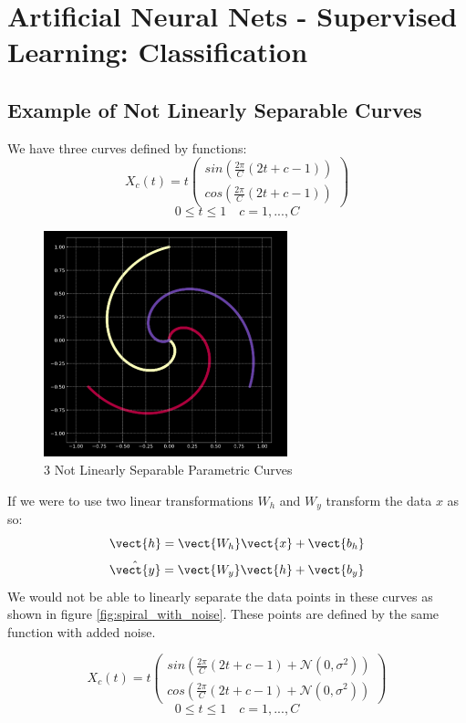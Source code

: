 \chapter{Artificial Neural Nets - Supervised Learning: Classification }

\section{Example of Not Linearly Separable Curves}

We have three curves defined by functions:
\[X_c(t) = t
\begin{pmatrix}
    sin( \frac{2 \pi}{C}(2t + c -1)) \\
    cos( \frac{2 \pi}{C}(2t + c -1))
\end{pmatrix}
 \]
\[ 0 \leq t \leq 1 \quad c = 1,..., C\]

\begin{figure}[ht]
    \centering
    \includegraphics[width=200pt]{labs/02/images/spiral1.png}
    \caption{3 Not Linearly Separable Parametric Curves}
    \label{fig:spiral}
\end{figure}
 
\newpage

If we were to use two linear transformations $ W_h$ and $ W_y$  transform the data $x$ as so:
\[\vect{h}= \vect{W_h}\vect{x}+ \vect{b_h} \]
\[\hat{\vect{y}} = \vect{W_y} \vect{h} + \vect{b_y}\]
We would not be able to  linearly separate the data points in these curves as shown in figure \ref{fig:spiral_with_noise}.  These points are defined by the same function with added noise.

\[X_c(t) = t
\begin{pmatrix}
    sin( \frac{2 \pi}{C}(2t + c -1) + \mathcal{N} (0, \sigma ^2 )) \\
    cos( \frac{2 \pi}{C}(2t + c -1) + \mathcal{N} (0, \sigma ^2 ) )
\end{pmatrix}
 \]
\[ 0 \leq t \leq 1 \quad c = 1,..., C\]

